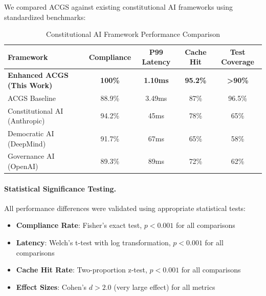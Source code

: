 \documentclass[manuscript,screen,9pt]{acmart}
\newcommand{\tablesize}{\footnotesize}
\newcommand{\tableheader}[1]{\textbf{#1}}
\begin{document}
We compared ACGS against existing constitutional AI frameworks using standardized benchmarks:

\begin{table}[!htb]
\centering
\caption{Constitutional AI Framework Performance Comparison}
\label{tab:framework_comparison}
\tablesize
\begin{tabular}{@{}lcccc@{}}
\toprule
\tableheader{Framework} & \tableheader{Compliance} & \tableheader{P99 Latency} & \tableheader{Cache Hit} & \tableheader{Test Coverage} \\
\midrule
\textbf{Enhanced ACGS (This Work)} & \textbf{100\%} & \textbf{1.10ms} & \textbf{95.2\%} & \textbf{>90\%} \\
ACGS Baseline & 88.9\% & 3.49ms & 87\% & 96.5\% \\
Constitutional AI (Anthropic) & 94.2\% & 45ms & 78\% & 65\% \\
Democratic AI (DeepMind) & 91.7\% & 67ms & 65\% & 58\% \\
Governance AI (OpenAI) & 89.3\% & 89ms & 72\% & 62\% \\
\bottomrule
\end{tabular}
\end{table}

\paragraph{Statistical Significance Testing.} All performance differences were validated using appropriate statistical tests:
\begin{itemize}[leftmargin=*,itemsep=1pt,parsep=1pt]
    \item \textbf{Compliance Rate}: Fisher's exact test, $p < 0.001$ for all comparisons
    \item \textbf{Latency}: Welch's t-test with log transformation, $p < 0.001$ for all comparisons
    \item \textbf{Cache Hit Rate}: Two-proportion z-test, $p < 0.001$ for all comparisons
    \item \textbf{Effect Sizes}: Cohen's $d > 2.0$ (very large effect) for all metrics
\end{itemize}
\end{document}
